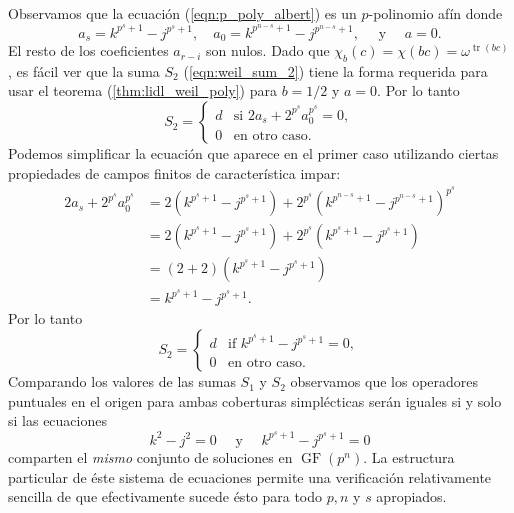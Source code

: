 \documentclass[a4paper,11pt]{report}
\DeclareMathOperator{\tr}{tr}
\DeclareMathOperator{\GF}{GF}
\begin{document}
  Observamos que la ecuación (\ref{eqn:p_poly_albert}) es un
  $p$-polinomio afín donde
  \begin{equation}
    a_s = k^{p^{s}+1} - j^{p^{s}+1},
    \quad
    a_0 = k^{p^{n-s}+1} - j^{p^{n-s}+1},
    \quad
    \text{ y }
    \quad a = 0.
  \end{equation}
  El resto de los coeficientes $a_{r-i}$ son nulos. Dado que
  $\chi_b(c) = \chi(bc) = \omega^{\tr(bc)}$, es fácil ver
  que la suma $S_2$ (\ref{eqn:weil_sum_2}) tiene la forma
  requerida para usar el teorema (\ref{thm:lidl_weil_poly})
  para $b = 1 / 2$ y $a = 0$. Por lo tanto
  \begin{equation}
    S_2
    = \begin{cases}
      d & \text{si } 2a_s + 2^{p^{s}} a_0^{p^{s}} = 0, \\
      0 & \text{en otro caso}.
    \end{cases}
  \end{equation}
  Podemos simplificar la ecuación que aparece en el primer
  caso utilizando ciertas propiedades de campos finitos de
  característica impar:
  \begin{align}
    2a_s + 2^{p^{s}}a_0^{p^{s}}
    &= 2 \left( k^{p^{s}+1} - j^{p^{s}+1} \right) 
    + 2^{p^{s}} \left( k^{p^{n-s}+1} - j^{p^{n-s}+1}
    \right)^{p^{s}} \\
    &= 2 \left( k^{p^{s}+1} - j^{p^{s}+1} \right) 
    + 2^{p^{s}} \left( k^{p^{s}+1} - j^{p^{s}+1} \right) \\
    &= (2+2) \left( k^{p^{s}+1} - j^{p^{s}+1} \right) \\
    &= k^{p^{s}+1} - j^{p^{s}+1}.
  \end{align}
  Por lo tanto
  \begin{equation}
    \label{eqn:weil_sum_2_ev}
    S_2
    = \begin{cases}
      d & \text{if } k^{p^{s}+1} - j^{p^{s}+1} = 0, \\
      0 & \text{en otro caso.}
    \end{cases}
  \end{equation}
  Comparando los valores de las sumas $S_1$ y $S_2$
  observamos que los operadores puntuales en el origen para
  ambas coberturas simplécticas serán iguales si y solo si
  las ecuaciones
  \begin{equation}
    \label{eqn:system}
    k^2 - j^2 = 0
    \quad
    \text{ y }
    \quad 
    k^{p^{s}+1} - j^{p^{s}+1} = 0
  \end{equation} 
  comparten el \textit{mismo} conjunto de soluciones en
  $\GF(p^{n})$. La estructura particular de éste sistema de
  ecuaciones permite una verificación relativamente sencilla
  de que efectivamente sucede ésto para todo $p,n$ y $s$
  apropiados.
\end{document}
